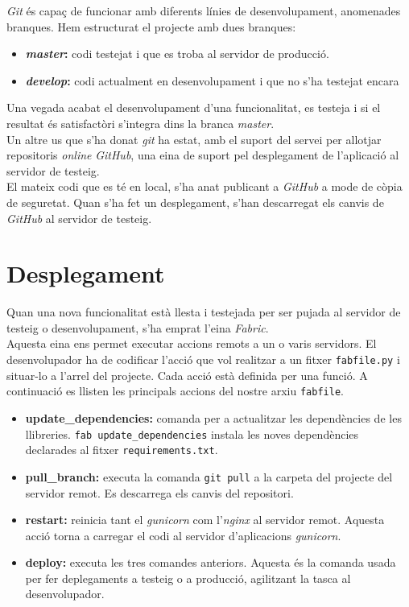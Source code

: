 \emph{Git} és capaç de funcionar amb diferents línies de desenvolupament, anomenades branques. Hem estructurat el projecte amb dues branques:

\begin{itemize}
	\item \textbf{\emph{master}:} codi testejat i que es troba al servidor de producció.
	\item \textbf{\emph{develop}:} codi actualment en desenvolupament i que no s'ha testejat encara
\end{itemize}

Una vegada acabat el desenvolupament d'una funcionalitat, es testeja i si el resultat és satisfactòri s'integra dins la branca \emph{master}.\\

Un altre us que s'ha donat \emph{git} ha estat, amb el suport del servei per allotjar repositoris \emph{online} \emph{GitHub}, una eina de suport pel desplegament de l'aplicació al servidor de testeig.\\

El mateix codi que es té en local, s'ha anat publicant a \emph{GitHub} a mode de còpia de seguretat. Quan s'ha fet un desplegament, s'han descarregat els canvis de \emph{GitHub} al servidor de testeig.

\section{Desplegament}

Quan una nova funcionalitat està llesta i testejada per ser pujada al servidor de testeig o desenvolupament, s'ha emprat l'eina \emph{Fabric}. \\

Aquesta eina ens permet executar accions remots a un o varis servidors. El desenvolupador ha de codificar l'acció que vol realitzar a un fitxer \texttt{fabfile.py} i situar-lo a l'arrel del projecte. Cada acció està definida per una funció. A continuació es llisten les principals accions del nostre arxiu \texttt{fabfile}.

\begin{itemize}
	\item \textbf{update\_dependencies:} comanda per a actualitzar les dependències de les llibreries. \texttt{fab update\_dependencies} instala les noves dependències declarades al fitxer \texttt{requirements.txt}.
	\item \textbf{pull\_branch:} executa la comanda \texttt{git pull} a la carpeta del projecte del servidor remot. Es descarrega els canvis del repositori.
	\item \textbf{restart:} reinicia tant el \emph{gunicorn} com l'\emph{nginx} al servidor remot. Aquesta acció torna a carregar el codi al servidor d'aplicacions \emph{gunicorn}.
	\item \textbf{deploy:} executa les tres comandes anteriors. Aquesta és la comanda usada per fer deplegaments a testeig o a producció, agilitzant la tasca al desenvolupador.
\end{itemize}